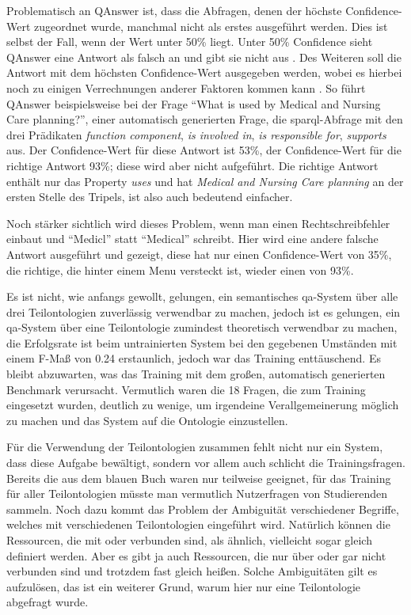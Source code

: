 Problematisch an QAnswer ist, dass die Abfragen, denen der höchste Confidence-Wert zugeordnet wurde, manchmal nicht als erstes ausgeführt werden.
Dies ist selbst der Fall, wenn der Wert unter 50\% liegt.
Unter 50\% Confidence sieht QAnswer eine Antwort als falsch an und gibt sie nicht aus \citep{qanswer}.
Des Weiteren soll die Antwort mit dem höchsten Confidence-Wert ausgegeben werden, wobei es hierbei noch zu einigen Verrechnungen anderer Faktoren kommen kann \citep{qanswerpatentapplication}.
So führt QAnswer beispielsweise bei der Frage \enquote{What is used by Medical and Nursing Care planning?},
einer automatisch generierten Frage, die \ac{sparql}-Abfrage mit den drei Prädikaten \emph{function component}, \emph{is involved in}, \emph{is responsible for}, \emph{supports} aus.
Der Confidence-Wert für diese Antwort ist 53\%, der Confidence-Wert für die richtige Antwort 93\%; diese wird aber nicht aufgeführt.
Die richtige Antwort enthält nur das Property \emph{uses} und hat \emph{Medical and Nursing Care planning} an der ersten Stelle des Tripels, ist also auch bedeutend einfacher.

Noch stärker sichtlich wird dieses Problem, wenn man einen Rechtschreibfehler einbaut und \enquote{Medicl} statt \enquote {Medical} schreibt.
Hier wird eine andere falsche Antwort ausgeführt und gezeigt, diese hat nur einen Confidence-Wert von 35\%, die richtige, die hinter einem Menu versteckt ist, wieder einen von 93\%.

Es ist nicht, wie anfangs gewollt, gelungen, ein semantisches \ac{qa}-System über alle drei Teilontologien zuverlässig verwendbar zu machen,
jedoch ist es gelungen, ein \ac{qa}-System über eine Teilontologie zumindest theoretisch verwendbar zu machen, die Erfolgsrate ist beim untrainierten System bei den gegebenen Umständen mit einem F-Maß von 0.24 erstaunlich, jedoch war das Training enttäuschend.
Es bleibt abzuwarten, was das Training mit dem großen, automatisch generierten Benchmark verursacht.
Vermutlich waren die 18 Fragen, die zum Training eingesetzt wurden, deutlich zu wenige, um irgendeine Verallgemeinerung möglich zu machen und das System auf die Ontologie einzustellen.

Für die Verwendung der Teilontologien zusammen fehlt nicht nur ein System, dass diese Aufgabe bewältigt, sondern vor allem auch schlicht die Trainingsfragen.
Bereits die aus dem blauen Buch waren nur teilweise geeignet, für das Training für aller Teilontologien müsste man vermutlich Nutzerfragen von Studierenden sammeln.
Noch dazu kommt das Problem der Ambiguität verschiedener Begriffe, welches mit verschiedenen Teilontologien eingeführt wird.
Natürlich können die Ressourcen, die mit  oder  verbunden sind, als ähnlich, vielleicht sogar gleich definiert werden.
Aber es gibt ja auch Ressourcen, die nur über  oder gar nicht verbunden sind und trotzdem fast gleich heißen.
Solche Ambiguitäten gilt es aufzulösen, das ist ein weiterer Grund, warum hier nur eine Teilontologie abgefragt wurde.


